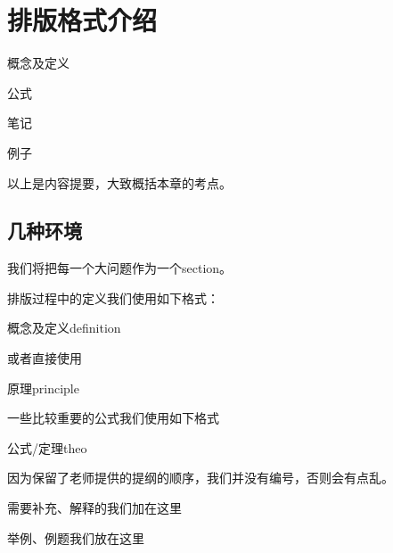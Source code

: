 \chapter*{排版格式介绍}
\begin{introduction}
	\item 概念及定义
	\item 公式
	\item 笔记
	\item 例子
\end{introduction}

以上是内容提要，大致概括本章的考点。

\section*{几种环境}
我们将把每一个大问题作为一个section。

排版过程中的定义我们使用如下格式：

\begin{definition*}{概念及定义}{definition}
	
\end{definition*}

或者直接使用
\begin{emptytcb*}{原理}{principle}
	
\end{emptytcb*}

一些比较重要的公式我们使用如下格式
\begin{theorem*}{公式/定理}{theo}
	
\end{theorem*}

因为保留了老师提供的提纲的顺序，我们并没有编号，否则会有点乱。

\begin{note}
需要补充、解释的我们加在这里
\end{note}

\begin{example}
	举例、例题我们放在这里
\end{example}